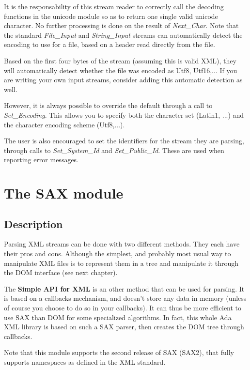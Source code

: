 \documentclass[letterpaper,10pt,english]{sphinxmanual}
\begin{document}
It is the responsability of this stream reader to correctly call the decoding
functions in the unicode module so as to return one single valid unicode
character. No further processing is done on the result of \emph{Next\_Char}. Note
that the standard \emph{File\_Input} and \emph{String\_Input} streams can automatically
detect the encoding to use for a file, based on a header read directly from the
file.

Based on the first four bytes of the stream (assuming this is valid XML), they
will automatically detect whether the file was encoded as Utf8, Utf16,... If
you are writing your own input streams, consider adding this automatic
detection as well.

However, it is always possible to override the default through a call to
\emph{Set\_Encoding}. This allows you to specify both the character set (Latin1, ...)
and the character encoding scheme (Utf8,...).

The user is also encouraged to set the identifiers for the stream they are
parsing, through calls to \emph{Set\_System\_Id} and \emph{Set\_Public\_Id}. These are used
when reporting error messages.


\chapter{The SAX module}
\label{sax:the-sax-module}\label{sax::doc}\label{sax:id1}

\section{Description}
\label{sax:description}
Parsing XML streams can be done with two different methods. They each have
their pros and cons. Although the simplest, and probably most usual way to
manipulate XML files is to represent them in a tree and manipulate it through
the DOM interface (see next chapter).

The \textbf{Simple API for XML} is an other method that can be used for parsing.  It
is based on a callbacks mechanism, and doesn't store any data in memory (unless
of course you choose to do so in your callbacks). It can thus be more efficient
to use SAX than DOM for some specialized algorithms.  In fact, this whole Ada
XML library is based on such a SAX parser, then creates the DOM tree through
callbacks.

Note that this module supports the second release of SAX (SAX2), that fully
supports namespaces as defined in the XML standard.
\end{document}
